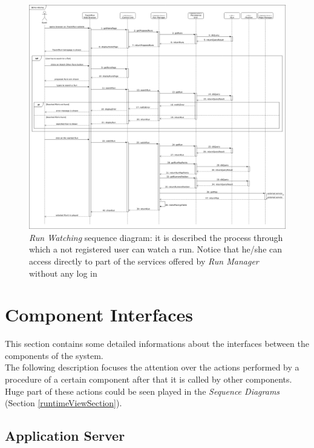 \begin{figure}[H]
  \begin{center}
  	\includegraphics[width=\textwidth]{./img/sequence/watchRun.png}
    \hspace{0.05\linewidth}
    \centering
    \caption{\textit{Run Watching} sequence diagram: it is described the process through which a not registered user can watch a run. Notice that he/she can access directly to part of the services offered by \textit{Run Manager} without any log in}
		\label{img:watchRun}
    \end{center}
\end{figure}


\clearpage

\section{Component Interfaces}
This section contains some detailed informations about the interfaces between the components of the system.\\
The following description focuses the attention over the actions performed by a procedure of a certain component after that it is called by other components.\\
Huge part of these actions could be seen played in the \textit{Sequence Diagrams} (Section \ref{runtimeViewSection}).

\subsection{Application Server}

